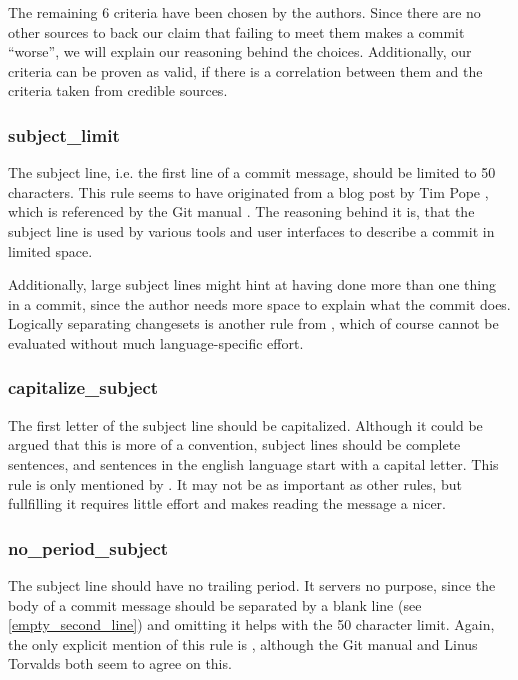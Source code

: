 The remaining 6 criteria have been chosen by the authors. Since there are no other sources to back our claim that failing to meet them makes a commit ``worse'', we will explain our reasoning behind the choices. Additionally, our criteria can be proven as valid, if there is a correlation between them and the criteria taken from credible sources. %


\subsubsection{subject_limit}
\label{subs:subject_limit}
The subject line, i.e. the first line of a commit message, should be limited to 50 characters. This rule seems to have originated from a blog post by Tim Pope \cite{TP}, which is referenced by the Git manual \cite{OffGuide}. The reasoning behind it is, that the subject line is used by various tools and user interfaces to describe a commit in limited space.

Additionally, large subject lines might hint at having done more than one thing in a commit, since the author needs more space to explain what the commit does. Logically separating changesets is another rule from \cite{OffGuide}, which of course cannot be evaluated without much language-specific effort.

\subsubsection{capitalize_subject}
\label{subs:capitalize_subject}
The first letter of the subject line should be capitalized. Although it could be argued that this is more of a convention, subject lines should be complete sentences, and sentences in the english language start with a capital letter. This rule is only mentioned by \cite{CB}. It may not be as important as other rules, but fullfilling it requires little effort and makes reading the message a nicer.

\subsubsection{no_period_subject}
\label{subs:no_period_subject}
The subject line should have no trailing period. It servers no purpose, since the body of a commit message should be separated by a blank line (see \ref{empty_second_line}) and omitting it helps with the 50 character limit. Again, the only explicit mention of this rule is \cite{CB}, although the Git manual \cite{OffGuide} and Linus Torvalds \cite{SR} both seem to agree on this.

